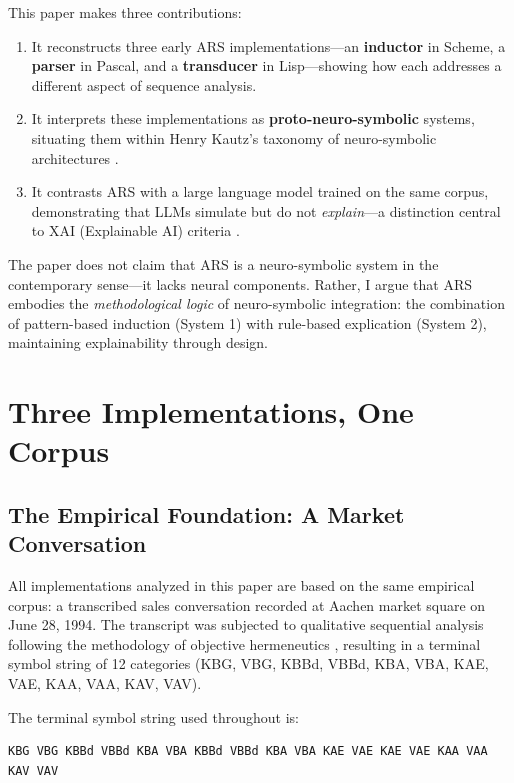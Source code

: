 \documentclass[12pt,a4paper]{article}
\begin{document}
This paper makes three contributions:

\begin{enumerate}
    \item It reconstructs three early ARS implementations—an \textbf{inductor} 
    in Scheme, a \textbf{parser} in Pascal, and a \textbf{transducer} in 
    Lisp—showing how each addresses a different aspect of sequence analysis.
    
    \item It interprets these implementations as \textbf{proto-neuro-symbolic} 
    systems, situating them within Henry Kautz's taxonomy of neuro-symbolic 
    architectures \citep{kautz2020third}.
    
    \item It contrasts ARS with a large language model trained on the same 
    corpus, demonstrating that LLMs simulate but do not \textit{explain}—a 
    distinction central to XAI (Explainable AI) criteria \citep{ortigossa2024xai}.
\end{enumerate}

The paper does not claim that ARS is a neuro-symbolic system in the contemporary 
sense—it lacks neural components. Rather, I argue that ARS embodies the 
\textit{methodological logic} of neuro-symbolic integration: the combination of 
pattern-based induction (System 1) with rule-based explication (System 2), 
maintaining explainability through design.

\section{Three Implementations, One Corpus}

\subsection{The Empirical Foundation: A Market Conversation}

All implementations analyzed in this paper are based on the same empirical 
corpus: a transcribed sales conversation recorded at Aachen market square on 
June 28, 1994. The transcript was subjected to qualitative sequential analysis 
following the methodology of objective hermeneutics \citep{oevermann1979methodology}, 
resulting in a terminal symbol string of 12 categories (KBG, VBG, KBBd, VBBd, 
KBA, VBA, KAE, VAE, KAA, VAA, KAV, VAV).

The terminal symbol string used throughout is:

\begin{verbatim}
KBG VBG KBBd VBBd KBA VBA KBBd VBBd KBA VBA KAE VAE KAE VAE KAA VAA KAV VAV
\end{verbatim}
\end{document}
